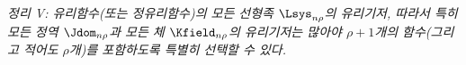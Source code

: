 
\emph{정리 V: 유리함수(또는 정유리함수)의 모든 선형족 $\Lsys_{n\rho}$의 유리기저, 따라서 특히 모든 정역 $\Jdom_{n\rho}$과 모든 체 $\Kfield_{n\rho}$의 유리기저는 많아야 $\rho+1$개의 함수(그리고 적어도 $\rho$개)를 포함하도록 특별히 선택할 수 있다.}
